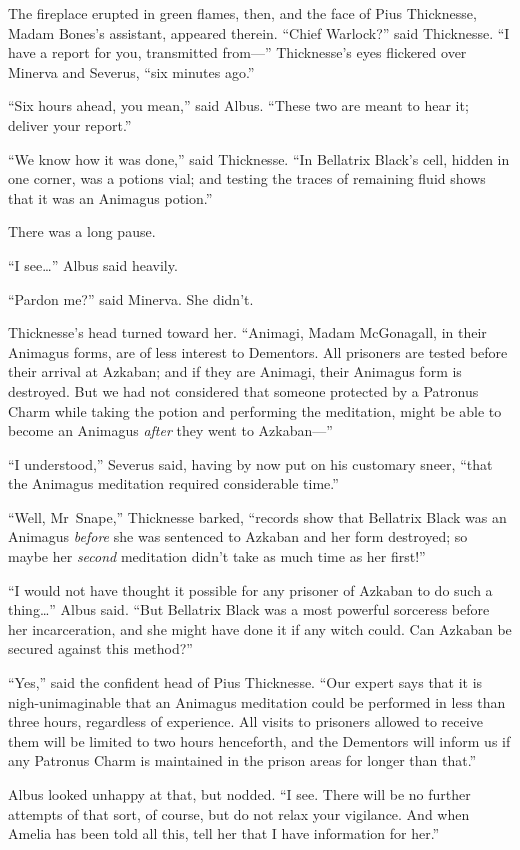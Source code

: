 The fireplace erupted in green flames, then, and the face of Pius Thicknesse, Madam Bones’s assistant, appeared therein. “Chief Warlock?” said Thicknesse. “I have a report for you, transmitted from—” Thicknesse’s eyes flickered over Minerva and Severus, “six minutes ago.”

“Six hours ahead, you mean,” said Albus. “These two are meant to hear it; deliver your report.”

“We know how it was done,” said Thicknesse. “In Bellatrix Black’s cell, hidden in one corner, was a potions vial; and testing the traces of remaining fluid shows that it was an Animagus potion.”

There was a long pause.

“I see…” Albus said heavily.

“Pardon me?” said Minerva. She didn’t.

Thicknesse’s head turned toward her. “Animagi, Madam McGonagall, in their Animagus forms, are of less interest to Dementors. All prisoners are tested before their arrival at Azkaban; and if they are Animagi, their Animagus form is destroyed. But we had not considered that someone protected by a Patronus Charm while taking the potion and performing the meditation, might be able to become an Animagus \emph{after} they went to Azkaban—”

“I understood,” Severus said, having by now put on his customary sneer, “that the Animagus meditation required considerable time.”

“Well, Mr~Snape,” Thicknesse barked, “records show that Bellatrix Black was an Animagus \emph{before} she was sentenced to Azkaban and her form destroyed; so maybe her \emph{second} meditation didn’t take as much time as her first!”

“I would not have thought it possible for any prisoner of Azkaban to do such a thing…” Albus said. “But Bellatrix Black was a most powerful sorceress before her incarceration, and she might have done it if any witch could. Can Azkaban be secured against this method?”

“Yes,” said the confident head of Pius Thicknesse. “Our expert says that it is nigh-unimaginable that an Animagus meditation could be performed in less than three hours, regardless of experience. All visits to prisoners allowed to receive them will be limited to two hours henceforth, and the Dementors will inform us if any Patronus Charm is maintained in the prison areas for longer than that.”

Albus looked unhappy at that, but nodded. “I see. There will be no further attempts of that sort, of course, but do not relax your vigilance. And when Amelia has been told all this, tell her that I have information for her.”

